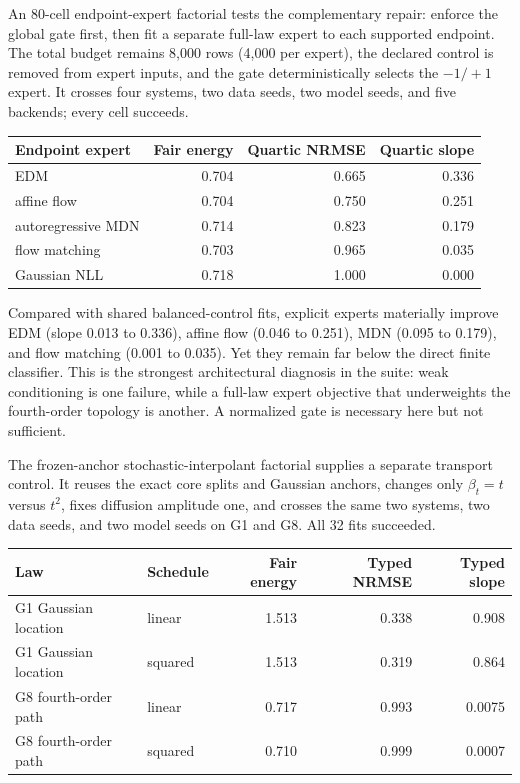 An 80-cell endpoint-expert factorial tests the complementary repair: enforce the
global gate first, then fit a separate full-law expert to each supported endpoint.
The total budget remains 8,000 rows (4,000 per expert), the declared control is
removed from expert inputs, and the gate deterministically selects the $-1/+1$
expert.  It crosses four systems, two data seeds, two model seeds, and five
backends; every cell succeeds.

\begin{center}
\begin{tabular}{@{}lrrr@{}}
\toprule
Endpoint expert & Fair energy & Quartic NRMSE & Quartic slope \\
\midrule
EDM & 0.704 & 0.665 & 0.336 \\
affine flow & 0.704 & 0.750 & 0.251 \\
autoregressive MDN & 0.714 & 0.823 & 0.179 \\
flow matching & 0.703 & 0.965 & 0.035 \\
Gaussian NLL & 0.718 & 1.000 & 0.000 \\
\bottomrule
\end{tabular}
\end{center}

Compared with shared balanced-control fits, explicit experts materially improve
EDM (slope 0.013 to 0.336), affine flow (0.046 to 0.251), MDN (0.095 to 0.179),
and flow matching (0.001 to 0.035).  Yet they remain far below the direct finite
classifier.  This is the strongest architectural diagnosis in the suite: weak
conditioning is one failure, while a full-law expert objective that underweights
the fourth-order topology is another.  A normalized gate is necessary here but
not sufficient.

The frozen-anchor stochastic-interpolant factorial supplies a separate transport
control.  It reuses the exact core splits and Gaussian anchors, changes only
$\beta_t=t$ versus $t^2$, fixes diffusion amplitude one, and crosses the same two
systems, two data seeds, and two model seeds on G1 and G8.  All 32 fits succeeded.

\begin{center}
\begin{tabular}{@{}llrrr@{}}
\toprule
Law & Schedule & Fair energy & Typed NRMSE & Typed slope \\
\midrule
G1 Gaussian location & linear & 1.513 & 0.338 & 0.908 \\
G1 Gaussian location & squared & 1.513 & 0.319 & 0.864 \\
G8 fourth-order path & linear & 0.717 & 0.993 & 0.0075 \\
G8 fourth-order path & squared & 0.710 & 0.999 & 0.0007 \\
\bottomrule
\end{tabular}
\end{center}

